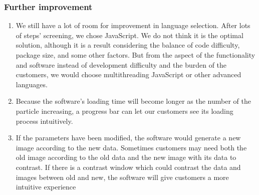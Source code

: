 \documentclass[11pt,oneside,a4paper]{article}
\begin{document}
\subsubsection{Further improvement}
\begin{enumerate}
  \item We still have a lot of room for improvement in language selection. After lots of steps’ screening, we chose JavaScript. We do not think it is the optimal solution, although it is a result considering the balance of code difficulty, package size, and some other factors.   But from the aspect of the functionality and software instead of development difficulty and the burden of the customers, we would choose multithreading JavaScript or other advanced languages.
  \item Because the software’s loading time will become longer as the number of the particle increasing, a progress bar can let our customers see its loading process intuitively.
  \item If the parameters have been modified, the software would generate a new image according to the new data. Sometimes customers may need both the old image according to the old data and the new image with its data to contrast. If there is a contrast window which could contrast the data and images between old and new, the software will give customers a more intuitive experience
\end{enumerate}
\end{document}
